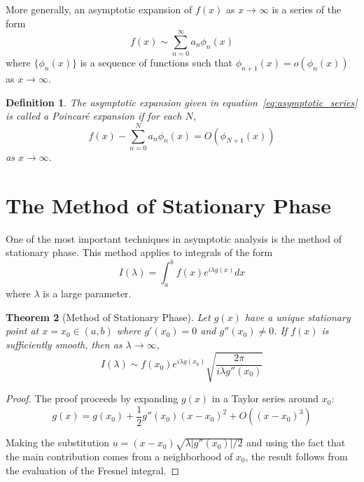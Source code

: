\documentclass[11pt]{article}
\newtheorem{theorem}{Theorem}[section]
\newtheorem{definition}[theorem]{Definition}
\begin{document}
More generally, an asymptotic expansion of $f(x)$ as $x \to \infty$ is a series of the form
\begin{equation}\label{eq:asymptotic_series}
f(x) \sim \sum_{n=0}^{\infty} a_n \phi_n(x)
\end{equation}
where $\{\phi_n(x)\}$ is a sequence of functions such that $\phi_{n+1}(x) = o(\phi_n(x))$ as $x \to \infty$.

\begin{definition}\label{def:poincare_expansion}
The asymptotic expansion given in equation~\eqref{eq:asymptotic_series} is called a Poincaré expansion if for each $N$,
\begin{equation}\label{eq:poincare_condition}
f(x) - \sum_{n=0}^{N} a_n \phi_n(x) = O(\phi_{N+1}(x))
\end{equation}
as $x \to \infty$.
\end{definition}

\section{The Method of Stationary Phase}\label{sec:stationary_phase}

One of the most important techniques in asymptotic analysis is the method of stationary phase. This method applies to integrals of the form
\begin{equation}\label{eq:stationary_phase_integral}
I(\lambda) = \int_a^b f(x) e^{i\lambda g(x)} dx
\end{equation}
where $\lambda$ is a large parameter.

\begin{theorem}[Method of Stationary Phase]\label{thm:stationary_phase}
Let $g(x)$ have a unique stationary point at $x = x_0 \in (a,b)$ where $g'(x_0) = 0$ and $g''(x_0) \neq 0$. If $f(x)$ is sufficiently smooth, then as $\lambda \to \infty$,
\begin{equation}\label{eq:stationary_phase_result}
I(\lambda) \sim f(x_0) e^{i\lambda g(x_0)} \sqrt{\frac{2\pi}{i\lambda g''(x_0)}}
\end{equation}
\end{theorem}

\begin{proof}
The proof proceeds by expanding $g(x)$ in a Taylor series around $x_0$:
\begin{equation}\label{eq:taylor_expansion}
g(x) = g(x_0) + \frac{1}{2}g''(x_0)(x-x_0)^2 + O((x-x_0)^3)
\end{equation}

Making the substitution $u = (x-x_0)\sqrt{\lambda |g''(x_0)|/2}$ and using the fact that the main contribution comes from a neighborhood of $x_0$, the result follows from the evaluation of the Fresnel integral.
\end{proof}
\end{document}
